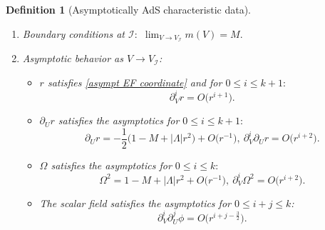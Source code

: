\documentclass[11pt]{article}
\newtheorem{definition}{Definition}[section]
\numberwithin{equation}{section}
\begin{document}
\begin{definition}[Asymptotically AdS characteristic data]
\begin{enumerate}
        \item Boundary conditions at $\mathcal{I}:$ $\lim_{V\rightarrow V_{\mathcal{I}}}m(V)=M.$
        \item Asymptotic behavior as $V\rightarrow V_{\mathcal{I}}$:
        \begin{itemize}
            \item $r$ satisfies \eqref{asympt EF coordinate} and for $0\leq i\leq k+1:$
            \begin{equation}\label{asympt behavior dv r}
                \partial_V^ir=O\big(r^{i+1}\big).
            \end{equation}
            \item $\partial_Ur$ satisfies the asymptotics for $0\leq i\leq k+1:$
            \begin{equation}\label{asympt behavior du r}
                \partial_Ur=-\frac{1}{2}\big(1-M+|\Lambda|r^2\big)+O\big(r^{-1}\big),\ \partial_V^i\partial_Ur=O\big(r^{i+2}\big).
            \end{equation}
            \item $\Omega$ satisfies the asymptotics for $0\leq i\leq k:$
            \begin{equation}\label{asympt behavior Lapse}
                \Omega^2=1-M+|\Lambda|r^2+O\big(r^{-1}\big),\ \partial_V^i\Omega^2=O\big(r^{i+2}\big).
            \end{equation}
            \item The scalar field satisfies the asymptotics for $0\leq i+j\leq k$:
            \begin{equation}\label{asympt behavior phi}
            \partial_V^{i}\partial_U^j\phi=O\big(r^{i+j-\frac{3}{2}}\big).
        \end{equation}
        \end{itemize}
    \end{enumerate}
\end{definition}
\end{document}
